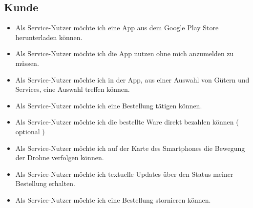 \subsection{Kunde}
\begin{itemize}
\item Als Service-Nutzer möchte ich eine App aus dem Google Play Store herunterladen können.
\item Als Service-Nutzer möchte ich die App nutzen ohne mich anzumelden zu müssen.
\item Als Service-Nutzer möchte ich in der App, aus einer Auswahl von Gütern und Services, eine Auswahl treffen können.
\item Als Service-Nutzer möchte ich eine Bestellung tätigen können.
\item Als Service-Nutzer möchte ich die bestellte Ware direkt bezahlen können ( optional )
\item Als Service-Nutzer möchte ich auf der Karte des Smartphones die Bewegung der Drohne verfolgen können.
\item Als Service-Nutzer möchte ich textuelle Updates über den Status meiner Bestellung erhalten.
\item Als Service-Nutzer möchte ich eine Bestellung stornieren können.

\end{itemize}

